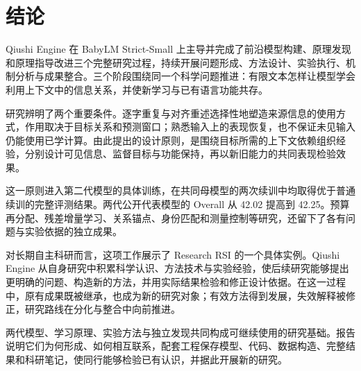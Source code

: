 \FloatBarrier{}\section{结论}

Qiushi Engine 在 BabyLM Strict-Small 上主导并完成了前沿模型构建、原理发现和原理指导改进三个完整研究过程，持续开展问题形成、方法设计、实验执行、机制分析与成果整合。三个阶段围绕同一个科学问题推进：有限文本怎样让模型学会利用上下文中的信息关系，并使新学习与已有语言功能共存。

研究辨明了两个重要条件。逐字重复与对齐重述选择性地塑造来源信息的使用方式，作用取决于目标关系和预测窗口；熟悉输入上的表现恢复，也不保证未见输入仍能使用已学计算。由此提出的设计原则，是围绕目标所需的上下文依赖组织经验，分别设计可见信息、监督目标与功能保持，再以新旧能力的共同表现检验效果。

这一原则进入第二代模型的具体训练，在共同母模型的两次续训中均取得优于普通续训的完整评测结果。两代公开代表模型的 Overall 从 42.02 提高到 42.25。预算再分配、残差增量学习、关系锚点、身份匹配和测量控制等研究，还留下了各有问题与实验依据的独立成果。

对长期自主科研而言，这项工作展示了 Research RSI 的一个具体实例。Qiushi Engine 从自身研究中积累科学认识、方法技术与实验经验，使后续研究能够提出更明确的问题、构造新的方法，并用实际结果检验和修正设计依据。在这一过程中，原有成果既被继承，也成为新的研究对象；有效方法得到发展，失效解释被修正，研究路线在分化与整合中向前推进。

两代模型、学习原理、实验方法与独立发现共同构成可继续使用的研究基础。报告说明它们为何形成、如何相互联系，配套工程保存模型、代码、数据构造、完整结果和科研笔记，使同行能够检验已有认识，并据此开展新的研究。
